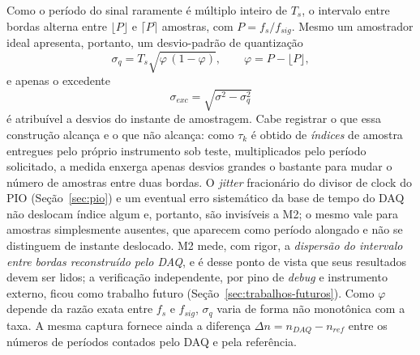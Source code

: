Como o período do sinal raramente é múltiplo inteiro de $T_s$, o intervalo
entre bordas alterna entre $\lfloor P \rfloor$ e $\lceil P \rceil$ amostras,
com $P = f_s/f_{sig}$. Mesmo um amostrador ideal apresenta, portanto, um
desvio-padrão de quantização
\begin{equation}\label{eq:jitter-quant}
  \sigma_q = T_s \sqrt{\varphi\,(1-\varphi)}, \qquad \varphi = P - \lfloor P \rfloor ,
\end{equation}
e apenas o excedente
\begin{equation}\label{eq:jitter-exc}
  \sigma_{exc} = \sqrt{\sigma^2 - \sigma_q^2}
\end{equation}
é atribuível a desvios do instante de amostragem. Cabe registrar o que essa
construção alcança e o que não alcança: como $\tau_k$ é obtido de
\emph{índices} de amostra entregues pelo próprio instrumento sob teste,
multiplicados pelo período solicitado, a medida enxerga apenas desvios
grandes o bastante para mudar o número de amostras entre duas bordas. O
\emph{jitter} fracionário do divisor de clock do \ac{PIO}
(Seção~\ref{sec:pio}) e um eventual erro sistemático da base de tempo do
\ac{DAQ} não deslocam índice algum e, portanto, são invisíveis a M2; o mesmo
vale para amostras simplesmente ausentes, que aparecem como período alongado
e não se distinguem de instante deslocado. M2 mede, com rigor, a
\emph{dispersão do intervalo entre bordas reconstruído pelo \ac{DAQ}}, e é
desse ponto de vista que seus resultados devem ser lidos; a verificação
independente, por pino de \emph{debug} e instrumento externo, ficou como
trabalho futuro (Seção~\ref{sec:trabalhos-futuros}). Como $\varphi$
depende da razão exata entre $f_s$ e $f_{sig}$, $\sigma_q$ varia de forma não
monotônica com a taxa. A mesma captura fornece ainda a diferença
$\Delta n = n_{DAQ} - n_{ref}$ entre os números de períodos contados pelo
\ac{DAQ} e pela referência.

